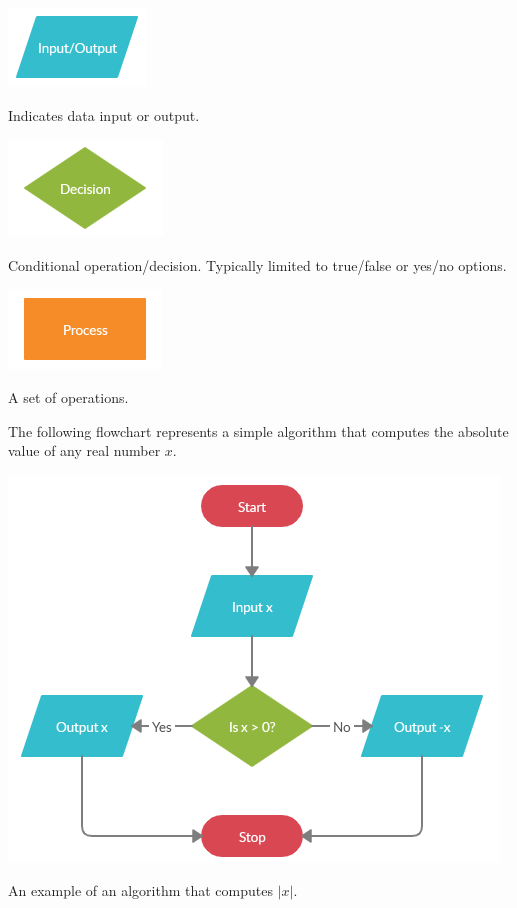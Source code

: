 \documentclass{ximera}
\begin{document}
\begin{center}
	\includegraphics{io.png}
\end{center}
\begin{center}
	Indicates data input or output.
\end{center}

\begin{center}
	\includegraphics{decision.png}
\end{center}
\begin{center}
	Conditional operation/decision. Typically limited to true/false or yes/no options.
\end{center}

\begin{center}
	\includegraphics{process.png}
\end{center}
\begin{center}
	A set of operations.
\end{center}

The following flowchart represents a simple algorithm that computes the absolute value of any real number $x$.

\begin{center}
	\includegraphics{absalgo.png}
\end{center}
\begin{center}
	An example of an algorithm that computes $|x|$.
\end{center}
\end{document}
